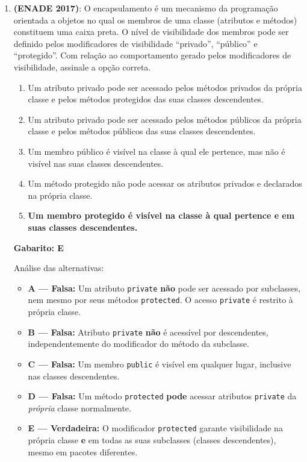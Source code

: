 \documentclass[12pt,a4paper]{article}
\begin{document}
\begin{enumerate}

\item \textbf{(ENADE 2017)}: O encapsulamento é um mecanismo da programação orientada a objetos no qual os membros de uma classe (atributos e métodos) constituem uma caixa preta. O nível de visibilidade dos membros pode ser definido pelos modificadores de visibilidade ``privado'', ``público'' e ``protegido''. Com relação ao comportamento gerado pelos modificadores de visibilidade, assinale a opção correta.
    \begin{enumerate}[label=\Alph*)]
        \item Um atributo privado pode ser acessado pelos métodos privados da própria classe e pelos métodos protegidos das suas classes descendentes.
        \item Um atributo privado pode ser acessado pelos métodos públicos da própria classe e pelos métodos públicos das suas classes descendentes.
        \item Um membro público é visível na classe à qual ele pertence, mas não é visível nas suas classes descendentes.
        \item Um método protegido não pode acessar os atributos privados e declarados na própria classe.
        \item[\textbf{E)}] \textbf{Um membro protegido é visível na classe à qual pertence e em suas classes descendentes.} \checkmark
    \end{enumerate}

\begin{tcolorbox}[respostabox]
\textbf{Gabarito: E}

Análise das alternativas:
\begin{itemize}
    \item \textbf{A — Falsa:} Um atributo \texttt{private} \textbf{não} pode ser acessado por subclasses, nem mesmo por seus métodos \texttt{protected}. O acesso \texttt{private} é restrito à própria classe.
    \item \textbf{B — Falsa:} Atributo \texttt{private} \textbf{não} é acessível por descendentes, independentemente do modificador do método da subclasse.
    \item \textbf{C — Falsa:} Um membro \texttt{public} é visível em qualquer lugar, inclusive nas classes descendentes.
    \item \textbf{D — Falsa:} Um método \texttt{protected} \textbf{pode} acessar atributos \texttt{private} da \textit{própria} classe normalmente.
    \item \textbf{E — Verdadeira:} O modificador \texttt{protected} garante visibilidade na própria classe \textbf{e} em todas as suas subclasses (classes descendentes), mesmo em pacotes diferentes.
\end{itemize}
\end{tcolorbox}


\end{enumerate}
\end{document}
